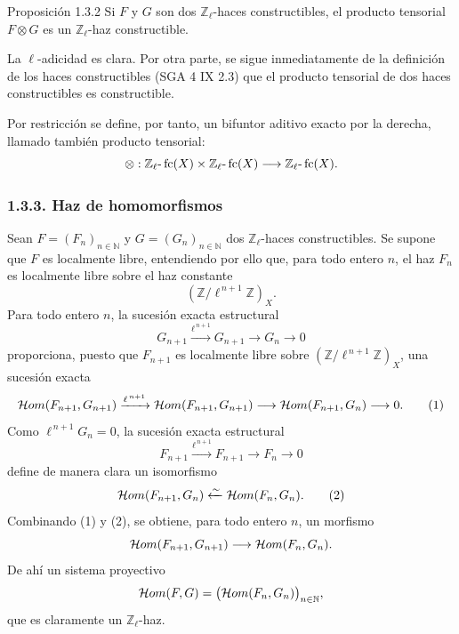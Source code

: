 \begin{statement}{Proposición 1.3.2}
Si \(F\) y \(G\) son dos \(\mathbb Z_\ell\)-haces constructibles, el producto tensorial \(F\otimes G\) es un \(\mathbb Z_\ell\)-haz constructible.
\end{statement}

\begin{prooftext}[Demostración]
La \(\ell\)-adicidad es clara. Por otra parte, se sigue inmediatamente de la definición de los haces constructibles (SGA 4 IX 2.3) que el producto tensorial de dos haces constructibles es constructible.
\end{prooftext}

Por restricción se define, por tanto, un bifuntor aditivo exacto por la derecha, llamado también producto tensorial:
\[
\otimes:\mathbb Z_\ell\text{-}\operatorname{fc}(X)\times \mathbb Z_\ell\text{-}\operatorname{fc}(X)
\longrightarrow \mathbb Z_\ell\text{-}\operatorname{fc}(X).
\]

\subsubsection*{1.3.3. Haz de homomorfismos}

Sean \(F=(F_n)_{n\in\mathbb N}\) y \(G=(G_n)_{n\in\mathbb N}\) dos \(\mathbb Z_\ell\)-haces constructibles. Se supone que \(F\) es localmente libre, entendiendo por ello que, para todo entero \(n\), el haz \(F_n\) es localmente libre sobre el haz constante
\[
(\mathbb Z/\ell^{\,n+1}\mathbb Z)_X.
\]
Para todo entero \(n\), la sucesión exacta estructural
\[
G_{n+1}\xrightarrow{\ell^{\,n+1}}G_{n+1}\longrightarrow G_n\longrightarrow 0
\]
proporciona, puesto que \(F_{n+1}\) es localmente libre sobre \((\mathbb Z/\ell^{\,n+1}\mathbb Z)_X\), una sucesión exacta
\[
\mathcal{H}om(F_{n+1},G_{n+1})
 \xrightarrow{\ell^{\,n+1}}
\mathcal{H}om(F_{n+1},G_{n+1})
 \longrightarrow
\mathcal{H}om(F_{n+1},G_n)
 \longrightarrow 0.
\tag{1}
\]
Como \(\ell^{\,n+1}G_n=0\), la sucesión exacta estructural
\[
F_{n+1}\xrightarrow{\ell^{\,n+1}}F_{n+1}\longrightarrow F_n\longrightarrow 0
\]
define de manera clara un isomorfismo
\[
\mathcal{H}om(F_{n+1},G_n)\xleftarrow{\sim}\mathcal{H}om(F_n,G_n).
\tag{2}
\]
Combinando (1) y (2), se obtiene, para todo entero \(n\), un morfismo
\[
\mathcal{H}om(F_{n+1},G_{n+1})\longrightarrow \mathcal{H}om(F_n,G_n).
\]
De ahí un sistema proyectivo
\[
\mathcal{H}om(F,G)=\bigl(\mathcal{H}om(F_n,G_n)\bigr)_{n\in\mathbb N},
\]
que es claramente un \(\mathbb Z_\ell\)-haz.
